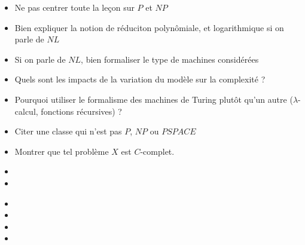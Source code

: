 \documentclass{agregfiche}
\begin{document}
\secpieges

\begin{itemize}
    \item Ne pas centrer toute la leçon sur $P$ et $NP$
    \item Bien expliquer la notion de réduciton polynômiale,
        et logarithmique si on parle de $NL$
    \item Si on parle de $NL$, bien formaliser le type de machines 
        considérées
\end{itemize}


\secquestionsclassiques

\begin{itemize}
    \item Quels sont les impacts de la variation du modèle sur la complexité ?
    \item Pourquoi utiliser le formalisme des machines de Turing 
        plutôt qu'un autre ($\lambda$-calcul, fonctions récursives) ?
    \item Citer une classe qui n'est pas $P$, $NP$ ou $PSPACE$
    \item Montrer que tel problème $X$ est $C$-complet.
\end{itemize}

\secreferences

\begin{itemize}
\item {}
\item {}
\end{itemize}

\secdev

\begin{itemize}
    \item {}
    \item {}
    \item {}
    \item {}
\end{itemize}
\end{document}
